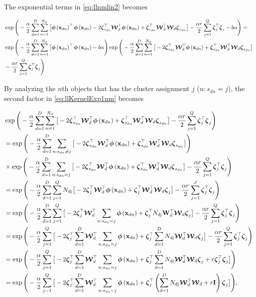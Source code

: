 	The exponential terms in \eqref{eq:llnmlin2} becomes
	
	\begin{align}
	&\exp\Bigg(-\frac{\alpha}{2} \sum_{d=1}^{D}\sum_{n=1}^{N_d}\big[ \phixnd^\top \phixnd- 2 \lvecs ^\top \projMat^\top \phixnd + \lvecs^\top \projMat^\top \projMat \lvecs\big]-\frac{\alpha r}{2} \sum_{j=1}^{Q}\lvec^\top\lvec -b\alpha\Bigg) = \notag\\
	& \exp\Bigg(-\frac{\alpha}{2} \sum_{d=1}^{D}\sum_{n=1}^{N_d}\big[ \phixnd^\top \phixnd-b\alpha\Bigg)\exp\Bigg(-\frac{\alpha}{2} \sum_{d=1}^{D}\sum_{n=1}^{N_d}\big[ -2 \lvecs ^\top \projMat^\top \phixnd + \lvecs^\top \projMat^\top \projMat \lvecs\big] \notag\\
	&-\frac{\alpha r}{2} \sum_{j=1}^{Q}\lvec^\top\lvec\Bigg) 
	\label{eq:llKernelExp1nm}
	\end{align}
	
	By analyzing the $n$th objects that has the cluster assignment $j$ ($n:s_{dn}=j$), the second factor in \eqref{eq:llKernelExp1nm} becomes
	
	\begin{align}
	&\exp\Bigg(-\frac{\alpha}{2} \sum_{d=1}^{D}\sum_{n=1}^{N_d}\big[ -2 \lvecs ^\top \projMat^\top \phixnd +\lvecs^\top \projMat^\top \projMat \lvecs \big] -\frac{\alpha r}{2} \sum_{j=1}^{Q}\lvec^\top\lvec \Bigg) \notag \\
	&= \exp\Bigg(-\frac{\alpha}{2} \sum_{d=1}^{D}\sum_{n:s_{dn}\ne j}\big[  -2 \lvecs ^\top \projMat^\top \phixnd+ \lvecs^\top \projMat^\top \projMat \lvecs \big] \Bigg) \notag\\
	&\times \exp\Bigg(-\frac{\alpha}{2} \sum_{d=1}^{D}\sum_{n:s_{dn}=j}\big[ -2 \lvecs ^\top \projMat^\top \phixnd+\lvecs^\top \projMat^\top \projMat \lvecs \big]-\frac{\alpha r}{2} \sum_{j=1}^{Q}\lvec^\top\lvec\Bigg) \notag\\
	&=\exp\Bigg(-\frac{\alpha}{2} \sum_{d=1}^{D}\sum_{j=1}^Q N_{dj}\big[ -2 \lvec ^\top \projMat^\top \phixnd+\lvec^\top \projMat^\top \projMat \lvec \big]-\frac{\alpha r}{2} \sum_{j=1}^{J}\lvec^\top\lvec\Bigg) \notag\\
	&=\exp\Bigg(-\frac{\alpha}{2} \sum_{d=1}^{D}\sum_{j=1}^Q \big[ -2 \lvec ^\top \projMat^\top \sum_{n:s_{dn}=j}\phixnd+\lvec^\top N_{dj}\projMatI^\top \projMat \lvec \big]-\frac{\alpha r}{2} \sum_{j=1}^{Q}\lvec^\top\lvec\Bigg) \notag \\
	&=\exp\Bigg(-\frac{\alpha}{2}\sum_{j=1}^Q \big[ -2 \lvec^\top  \sum_{d=1}^{D}\projMat^\top \sum_{n:s_{dn}=j}\phixnd+\lvec^\top  \sum_{d=1}^{D} N_{dj}\projMat^\top \projMat \lvec \big]-\frac{\alpha r}{2} \sum_{j=1}^{Q}\lvec^\top\lvec\Bigg) \notag \\
	&= \exp\Bigg(-\frac{\alpha}{2}\sum_{j=1}^Q \big[ -2 \lvec ^\top  \sum_{d=1}^{D}\projMat^\top \sum_{n:s_{dn}=j}\phixnd+\lvec^\top  \sum_{d=1}^{D} N_{dj}\projMat^\top \projMat \lvec + r\lvec^\top\lvec\big]\Bigg) \notag \\
	&= \exp\Bigg(-\frac{\alpha}{2}\sum_{j=1}^Q \big[ -2 \lvec ^\top  \sum_{d=1}^{D}\projMat^\top \sum_{n:s_{dn}=j}\phixnd+\lvec^\top  \left(\sum_{d=1}^{D} N_{dj}\projMat^\top \projMat + r\eye\right) \lvec \big]\Bigg),
	\label{eq:llExp1nm}
	\end{align}
	
